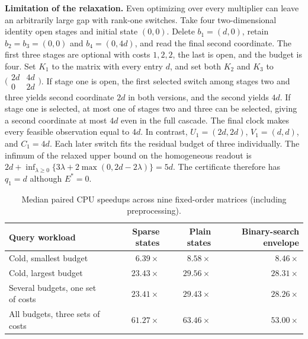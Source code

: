\documentclass[11pt,letterpaper]{article}
\begin{document}
\noindent\textbf{Limitation of the relaxation.} Even optimizing over every multiplier can leave an arbitrarily large gap with rank-one switches. Take four two-dimensional identity open stages and initial state $(0,0)$. Delete $b_1=(d,0)$, retain $b_2=b_3=(0,0)$ and $b_4=(0,4d)$, and read the final second coordinate. The first three stages are optional with costs $1,2,2$, the last is open, and the budget is four. Set $K_1$ to the matrix with every entry $d$, and set both $K_2$ and $K_3$ to $\bigl(\begin{smallmatrix}2d&4d\\0&2d\end{smallmatrix}\bigr)$. If stage one is open, the first selected switch among stages two and three yields second coordinate $2d$ in both versions, and the second yields $4d$. If stage one is selected, at most one of stages two and three can be selected, giving a second coordinate at most $4d$ even in the full cascade. The final clock makes every feasible observation equal to $4d$. In contrast, $U_1=(2d,2d)$, $V_1=(d,d)$, and $C_1=4d$. Each later switch fits the residual budget of three individually. The infimum of the relaxed upper bound on the homogeneous readout is $2d+\inf_{\lambda\ge0}\{3\lambda+2\max(0,2d-2\lambda)\}=5d$. The certificate therefore has $q_1=d$ although $E^*=0$.

\clearpage



\clearpage
\begin{table}[!ht]
\centering
\small
\caption{Median paired CPU speedups across nine fixed-order matrices (including preprocessing).}
\label{tab:app_speedups}
\begin{tabular}{lrrr}
\toprule
Query workload & Sparse states & Plain states & Binary-search envelope \\
\midrule
Cold, smallest budget & $6.39\times$ & $8.58\times$ & $8.46\times$ \\
Cold, largest budget & $23.43\times$ & $29.56\times$ & $28.31\times$ \\
Several budgets, one set of costs & $23.41\times$ & $29.43\times$ & $28.26\times$ \\
All budgets, three sets of costs & $61.27\times$ & $63.46\times$ & $53.00\times$ \\
\bottomrule
\end{tabular}
\end{table}
\end{document}
